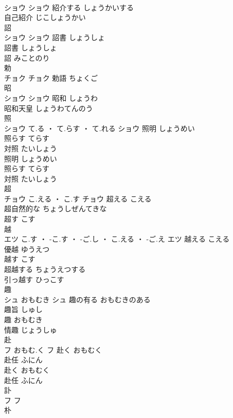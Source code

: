 \documentclass[8pt]{extreport}
\begin{document}
\begin{CJK}{UTF8}{min}
\\	ショウ		ショウ	紹介する	しょうかいする	
\\	自己紹介	じこしょうかい	
\\	詔	
\\	ショウ		ショウ	詔書	しょうしょ	
\\	詔書	しょうしょ	
\\	詔	みことのり	
\\	勅	
\\	チョク		チョク													勅語	ちょくご	
\\	昭	
\\	ショウ		ショウ	昭和	しょうわ	
\\	昭和天皇	しょうわてんのう	
\\	照	
\\	ショウ	て.る ・ て.らす ・ て.れる	ショウ	照明	しょうめい	
\\	照らす	てらす	
\\	対照	たいしょう	
\\	照明	しょうめい	
\\	照らす	てらす	
\\	対照	たいしょう	
\\	超	
\\	チョウ	こ.える ・ こ.す	チョウ	超える	こえる	
\\	超自然的な	ちょうしぜんてきな	
\\	超す	こす	
\\	越	
\\	エツ	こ.す ・ -こ.す ・ -ご.し ・ こ.える ・ -ご.え	エツ	越える	こえる	
\\	優越	ゆうえつ	
\\	越す	こす	
\\	超越する	ちょうえつする	
\\	引っ越す	ひっこす	
\\	趣	
\\	シュ	おもむき	シュ	趣の有る	おもむきのある	
\\	趣旨	しゅし	
\\	趣	おもむき	
\\	情趣	じょうしゅ	
\\	赴	
\\	フ	おもむ.く	フ	赴く	おもむく	
\\	赴任	ふにん	
\\	赴く	おもむく	
\\	赴任	ふにん	
\\	訃	
\\	フ		フ																																			
\\	朴	

\end{CJK}
\end{document}
